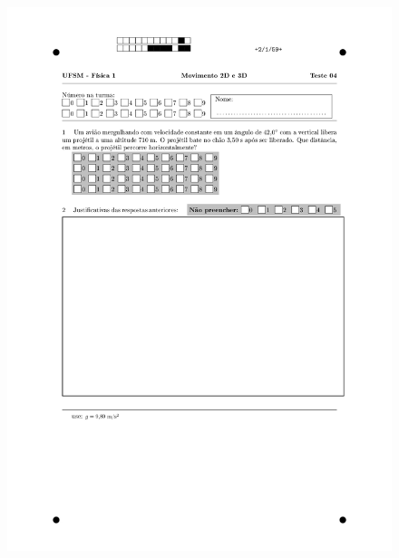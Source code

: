 \begin{figure}[H]\centering
\includegraphics[scale=0.7]{fig/orp1q3r_page-0002.jpg}
\end{figure}
\vspace*{\fill}
